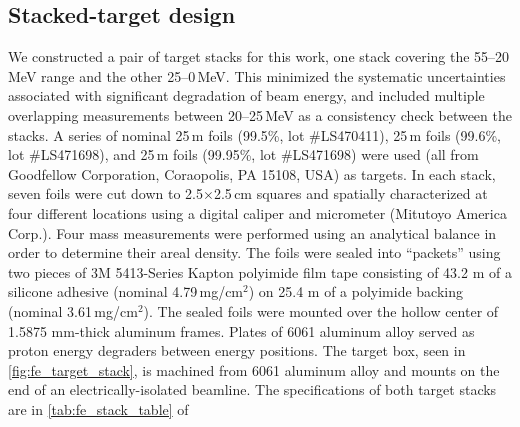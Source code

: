 \subsection{\label{sec:target_design_U5_d}Stacked-target design}


We constructed a pair of target stacks 
for this work,
one stack covering the 55--20\,MeV range and the other  25--0\,MeV.
This minimized the systematic uncertainties associated with significant degradation of beam energy, and
included multiple overlapping measurements between 20--25\,MeV as a consistency check between the stacks.
A series of nominal 25\,\mmicro m  foils (99.5\%, lot \#LS470411), 25\,\mmicro m  foils (99.6\%, lot \#LS471698), and 25\,\mmicro m  foils (99.95\%, lot \#LS471698) were used (all from Goodfellow Corporation, Coraopolis, PA 15108, USA) as targets.
In each stack, seven foils 
were cut down to 2.5$\times$2.5\,cm squares and spatially characterized 
at four different locations using a digital caliper and micrometer (Mitutoyo America Corp.).
Four mass measurements were performed using an analytical balance 
in order to determine their areal density. 
The foils were  sealed into \enquote{packets} using two pieces of  3M 5413-Series Kapton polyimide film tape 
consisting of 43.2 \mmicro m of a silicone adhesive (nominal 4.79\,mg/cm$^2$) on 25.4 \mmicro m of a polyimide backing (nominal 3.61\,mg/cm$^2$).
The sealed foils were mounted over the hollow center of  1.5875 mm-thick aluminum frames.
Plates of 6061 aluminum alloy  served as proton energy degraders  between energy positions.
The target box, seen in \autoref{fig:fe_target_stack}, is machined from 6061 aluminum alloy and mounts on the end of an electrically-isolated beamline.
The specifications of both target stacks 
are in \autoref{tab:fe_stack_table} of 




